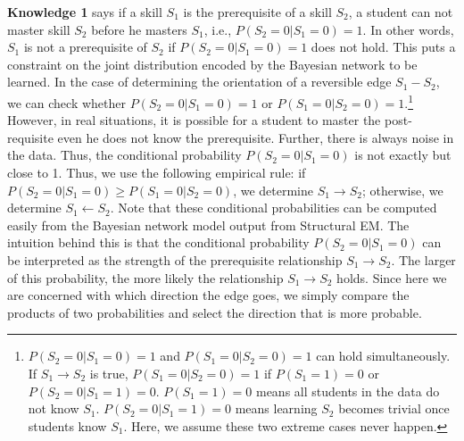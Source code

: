 \documentclass{edm_template}
\begin{document}
\textbf{Knowledge 1} says if a skill $S_1$ is the prerequisite of a skill $S_2$,
a student can not master skill $S_2$ before he masters $S_1$, i.e., $P(S_2=0|S_1=0)=1$.
In other words, $S_1$ is not a prerequisite of $S_2$ if $P(S_2=0|S_1=0)=1$ does not hold.
This puts a constraint on the joint distribution encoded by the Bayesian network to be learned.
In the case of determining the orientation of a reversible edge $S_1 - S_2$, we can check whether $P(S_2=0|S_1=0)=1$ or $P(S_1=0|S_2=0)=1$.\footnote{$P(S_2=0|S_1=0)=1$ and $P(S_1=0|S_2=0)=1$ can hold simultaneously. If $S_1\rightarrow S_2$ is true, $P(S_1=0|S_2=0)=1$ if $P(S_1=1)=0$ or $P(S_2=0|S_1=1)=0$. $P(S_1=1)=0$ means all students in the data do not know $S_1$. $P(S_2=0|S_1=1)=0$ means learning $S_2$ becomes trivial once students know $S_1$. Here, we assume these two extreme cases never happen.} 
However, in real situations, it is possible for a student to master the post-requisite even he does not know the prerequisite. 
Further, there is always noise in the data. Thus, the conditional probability $P(S_2=0|S_1=0)$ is not exactly but close to 1.
Thus, we use the following empirical rule: if $P(S_2=0|S_1=0)\ge P(S_1=0|S_2=0)$, we determine $S_1\rightarrow S_2$; 
otherwise, we determine $S_1\leftarrow S_2$.
Note that these conditional probabilities can be computed easily from the Bayesian network model output from Structural EM. 
The intuition behind this is that the conditional probability $P(S_2=0|S_1=0)$ can be interpreted as the strength of the prerequisite relationship $S_1\rightarrow S_2$.
The larger of this probability, the more likely the relationship $S_1\rightarrow S_2$ holds.
Since here we are concerned with which direction the edge goes, we simply compare the products of two probabilities and select the direction that is more probable. 
\end{document}
